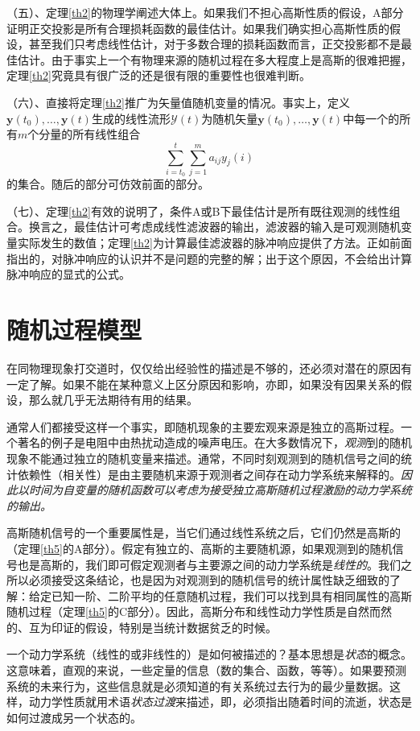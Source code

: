 \documentclass[UTF8,adobefonts]{ctexart}
\begin{document}
（五）、定理\ref{th2}的物理学阐述大体上。如果我们不担心高斯性质的假设，A部分证明正交投影是所有合理损耗函数的最佳估计。如果我们确实担心高斯性质的假设，甚至我们只考虑线性估计，对于多数合理的损耗函数而言，正交投影都不是最佳估计。由于事实上一个有物理来源的随机过程在多大程度上是高斯的很难把握，定理\ref{th2}究竟具有很广泛的还是很有限的重要性也很难判断。

（六）、直接将定理\ref{th2}推广为矢量值随机变量的情况。事实上，定义$\mathbf{y}(t_0),\dotsc,\mathbf{y}(t)$生成的线性流形$\mathbf{\mathcal{Y}}(t)$为随机矢量$\mathbf{y}(t_0),\dotsc,\mathbf{y}(t)$中每一个的所有$m$个分量的所有线性组合
\begin{equation*}
\sum^t_{i=t_0}\sum^m_{j=1}a_{ij}y_j (i)
\end{equation*}
的集合。随后的部分可仿效前面的部分。

（七）、定理\ref{th2}有效的说明了，条件A或B下最佳估计是所有既往观测的线性组合。换言之，最佳估计可考虑成线性滤波器的输出，滤波器的输入是可观测随机变量实际发生的数值；定理\ref{th2}为计算最佳滤波器的脉冲响应提供了方法。正如前面指出的，对脉冲响应的认识并不是问题的完整的解；出于这个原因，不会给出计算脉冲响应的显式的公式。

\section{随机过程模型}
在同物理现象打交道时，仅仅给出经验性的描述是不够的，还必须对潜在的原因有一定了解。如果不能在某种意义上区分原因和影响，亦即，如果没有因果关系的假设，那么就几乎无法期待有用的结果。

通常人们都接受这样一个事实，即随机现象的主要宏观来源是独立的高斯过程。一个著名的例子是电阻中由热扰动造成的噪声电压。在大多数情况下，\emph{观测}到的随机现象不能通过独立的随机变量来描述。通常，不同时刻观测到的随机信号之间的统计依赖性（相关性）是由主要随机来源于观测者之间存在动力学系统来解释的。\emph{因此以时间为自变量的随机函数可以考虑为接受独立高斯随机过程激励的动力学系统的输出。}

高斯随机信号的一个重要属性是，当它们通过线性系统之后，它们仍然是高斯的（定理\ref{th5}的A部分）。假定有独立的、高斯的主要随机源，如果观测到的随机信号也是高斯的，我们即可假定观测者与主要源之间的动力学系统是\emph{线性的}。我们之所以必须接受这条结论，也是因为对观测到的随机信号的统计属性缺乏细致的了解：给定已知一阶、二阶平均的任意随机过程，我们可以找到具有相同属性的高斯随机过程（定理\ref{th5}的C部分）。因此，高斯分布和线性动力学性质是自然而然的、互为印证的假设，特别是当统计数据贫乏的时候。

一个动力学系统（线性的或非线性的）是如何被描述的？基本思想是\emph{状态}的概念。这意味着，直观的来说，一些定量的信息（数的集合、函数，等等）。如果要预测系统的未来行为，这些信息就是必须知道的有关系统过去行为的最少量数据。这样，动力学性质就用术语\emph{状态过渡}来描述，即，必须指出随着时间的流逝，状态是如何过渡成另一个状态的。
\end{document}
